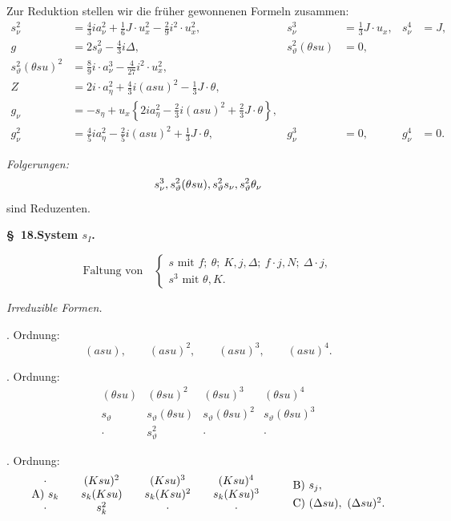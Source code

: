 \documentclass[11pt]{article}
\newcommand{\A}{\Delta}
\begin{document}
Zur Reduktion stellen wir die früher gewonnenen Formeln zusammen:
\[
\tag{24}
\begin{aligned}
s_\nu^2&=\frac43ia_\nu^2+\frac16J\cdot u_x^2-\frac29i^2\cdot u_x^2,
& s_\nu^3&=\frac13J\cdot u_x,
& s_\nu^4&=J,\\[0.3em]
g&=2s_\vartheta^2-\frac43i\A,
& s_\vartheta^2(\theta su)&=0,\\[0.3em]
s_\vartheta^2(\theta su)^2&=\frac89i\cdot a_\nu^3-\frac4{27}i^2\cdot u_x^2,\\[0.3em]
Z&=2i\cdot a_\eta^2+\frac43i(asu)^2-\frac13J\cdot\theta,\\[0.3em]
g_\nu&=-s_\eta+u_x\left\{2ia_\eta^2-\frac23i(asu)^2+\frac23J\cdot\theta\right\},\\[0.3em]
g_\nu^2&=\frac45ia_\eta^2-\frac25i(asu)^2+\frac13J\cdot\theta,
&g_\nu^3&=0,
&g_\nu^4&=0.
\end{aligned}
\]

\noindent\emph{Folgerungen:}
\[
 s_\nu^3,\\ s_\vartheta^2(\theta su),\\ s_\vartheta^2s_\nu,\\ s_\vartheta^2\theta_\nu
\]
sind Reduzenten.

\begin{center}
\textbf{\S\ 18.\quad System $s_I$.}
\end{center}

\[
\text{Faltung von}\quad
\left\{\begin{array}{l}
s\text{ mit } f;\ \theta;\ K,j,\A;\ f\cdot j,N;\ \A\cdot j,\\
s^3\text{ mit }\theta,K.
\end{array}\right.
\]

\noindent\emph{Irreduzible Formen.}

. Ordnung:
\[
(asu),\qquad (asu)^2,\qquad (asu)^3,\qquad (asu)^4.
\]

. Ordnung:
\[
\begin{array}{cccc}
(\theta su)&(\theta su)^2&(\theta su)^3&(\theta su)^4\\
s_\vartheta&s_\vartheta(\theta su)&s_\vartheta(\theta su)^2&s_\vartheta(\theta su)^3\\
\cdot&s_\vartheta^2&\cdot&\cdot
\end{array}
\]

. Ordnung:
\[
\begin{array}{c@{\qquad}c@{\qquad}c@{\qquad}c}
\cdot&(Ksu)^2&(Ksu)^3&(Ksu)^4\\
\text{A)}\ s_k&s_k(Ksu)&s_k(Ksu)^2&s_k(Ksu)^3\\
\cdot&s_k^2&\cdot&\cdot
\end{array}
\qquad
\begin{array}{l}
\text{B)}\ s_j,\\[0.4em]
\text{C)}\ (\A su),\ (\A su)^2.
\end{array}
\]
\end{document}
